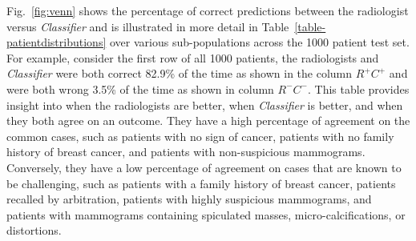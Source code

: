 \documentclass[journal]{IEEEtran}
\begin{document}
Fig.~\ref{fig:venn} shows the percentage of correct predictions between the radiologist versus \textit{Classifier} and is illustrated in more detail in Table~\ref{table-patientdistributions} over various sub-populations across the 1000 patient test set.  For example, consider the first row of all 1000 patients, the radiologists and \textit{Classifier} were both correct 82.9\% of the time as shown in the column $R^+C^+$ and were both wrong 3.5\% of the time as shown in column $R^-C^-$.
This table provides insight into when the radiologists are better, when \textit{Classifier} is better, and when they both agree on an outcome.  They have a high percentage of agreement on the common cases, such as patients with no sign of cancer, patients with no family history of breast cancer, and patients with non-suspicious mammograms.  Conversely, they have a low percentage of agreement on cases that are known to be challenging, such as patients with a family history of breast cancer, patients recalled by arbitration, patients with highly suspicious mammograms, and patients with mammograms containing spiculated masses, micro-calcifications, or distortions.
\end{document}
